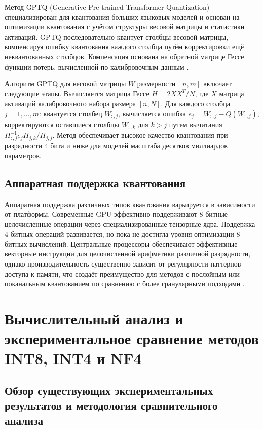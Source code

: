 \documentclass[bachelor, och, coursework]{SCWorks}
\begin{document}
	Метод GPTQ (Generative Pre-trained Transformer Quantization) специализирован для квантования больших языковых моделей и основан на оптимизации квантования с учётом структуры весовой матрицы и статистики активаций. GPTQ последовательно квантует столбцы весовой матрицы, компенсируя ошибку квантования каждого столбца путём корректировки ещё неквантованных столбцов. Компенсация основана на обратной матрице Гессе функции потерь, вычисленной по калибровочным данным \cite{gptq}.
	
	Алгоритм GPTQ для весовой матрицы \(W\) размерности \([n, m]\) включает следующие этапы. Вычисляется матрица Гессе \(H = 2 X X^{T} / N\), где \(X\) матрица активаций калибровочного набора размера \([n, N]\). Для каждого столбца \(j = 1, \dots, m\): квантуется столбец \(W_{:,j}\), вычисляется ошибка \(e_j = W_{:,j} - Q(W_{:,j})\), корректируются оставшиеся столбцы \(W_{:,k}\) для \(k > j\) путем вычитания \(H^{-1}_{:,j} e_j H_{j,k} / H_{j,j}\). Метод обеспечивает высокое качество квантования при разрядности 4 бита и ниже для моделей масштаба десятков миллиардов параметров.
	
	\subsection{Аппаратная поддержка квантования}
	
	Аппаратная поддержка различных типов квантования варьируется в зависимости от платформы. Современные GPU эффективно поддерживают 8-битные целочисленные операции через специализированные тензорные ядра. Поддержка 4-битных операций развивается, но пока не достигла уровня оптимизации 8-битных вычислений. Центральные процессоры обеспечивают эффективные векторные инструкции для целочисленной арифметики различной разрядности, однако производительность существенно зависит от регулярности паттернов доступа к памяти, что создаёт преимущество для методов с послойным или поканальным квантованием по сравнению с более гранулярными подходами \cite{gemv}.
	
	\section{Вычислительный анализ и экспериментальное сравнение методов INT8, INT4 и NF4}
	
	\subsection{Обзор существующих экспериментальных результатов и методология сравнительного анализа}
	
\end{document}

